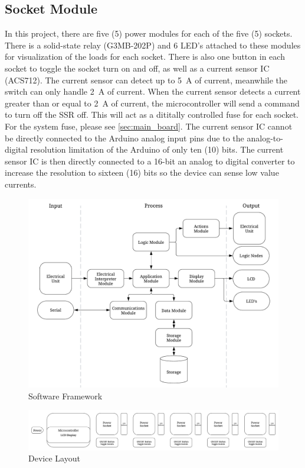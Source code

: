\documentclass[conference, a4paper]{IEEEtran}
\begin{document}
\subsection{Socket Module}
\label{sec:socket_module}
In this project, there are five (5) power modules for each of the five (5) sockets.
There is a solid-state relay (G3MB-202P) and 6 LED's attached to these modules for visualization of the loads for each socket.
There is also one button in each socket to toggle the socket turn on and off, as well as a current sensor IC (ACS712).
The current sensor can detect up to \SI{5}{\ampere} of current, meanwhile the switch can only handle \SI{2}{\ampere} of current.
When the current sensor detects a current greater than or equal to \SI{2}{\ampere} of current, the microcontroller
will send a command to turn off the SSR off. This will act as a dititally controlled fuse for each socket.
For the system fuse, please see \autoref{sec:main_board}.
The current sensor IC cannot be directly connected to the Arduino analog input pins due to the analog-to-digital resolution limitation of the Arduino of only ten (10) bits.
The current sensor IC is then directly connected to a 16-bit an analog to digital converter to increase the resolution to sixteen (16) bits
so the device can sense low value currents.


\begin{figure}[tbh]
  \centering
  \includegraphics[width=\columnwidth]{img/software_framework.png}
  \caption{Software Framework}
  \label{fig:software_ftamrwork}
\end{figure}

\begin{figure}[tbh]
  \centering
  \includegraphics[width=\textwidth]{img/device_layout.png}
  \caption{Device Layout}
  \label{fig:device_layout}
\end{figure}
\end{document}
